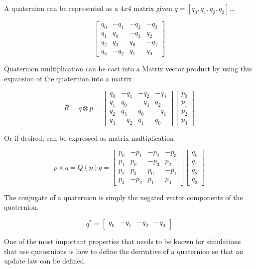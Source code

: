 A quaternion can be represented as a $4x4$ matrix given $q = [q_0, q_1, q_2, q_3]$... 

$$\begin{bmatrix}
    q_0 & -q_1 & -q_2 & -q_3 \\
    q_1 & q_0 & -q_3 & q_2 \\
    q_2 & q_3 & q_0 & -q_1 \\
    q_3 & -q_2 & q_1 & q_0
\end{bmatrix}$$

Quaternion multiplication can be cast into a Matrix vector product by using this expansion of the quaternion into a matrix 

$$R = q \otimes p = \begin{bmatrix}
    q_0 & -q_1 & -q_2 & -q_3 \\
    q_1 & q_0 & -q_3 & q_2 \\
    q_2 & q_3 & q_0 & -q_1 \\
    q_3 & -q_2 & q_1 & q_0
\end{bmatrix} \begin{bmatrix}
    p_0 \\
    p_1\\
    p_2 \\
    p_3
\end{bmatrix}$$




Or if desired, can be expressed as matrix multiplication 

$$p \times q = Q(p)q = \begin{bmatrix}
    p_0 & -p_1 & -p_2 & -p_3 \\
    p_1 & p_0 & -p_3 & p_2 \\
    p_2 & p_3 & p_0 & -p_1 \\
    p_3 & -p_2 & p_1 & p_0 
\end{bmatrix} \begin{bmatrix}
    q_0 \\ q_1 \\ q_2 \\ q_3
\end{bmatrix}$$

The conjugate of a quaternion is simply the negated vector components of the quaternion. 

$$q^{*} = \begin{bmatrix}
    q_0 & -q_1 & -q_2 & -q_3
\end{bmatrix}$$ 

One of the most important properties that needs to be known for simulations that use quaternions is how to define the derivative of a quaternion so that an update law can be defined. 

